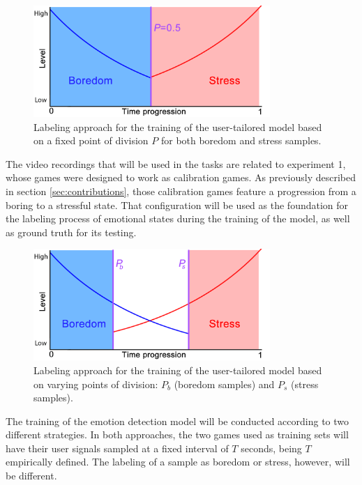 \begin{figure}[h]
    \centering
    \includegraphics[width=0.8\textwidth]{figures/machine-learning-labeling-approach-A.png}
    \caption{Labeling approach for the training of the user-tailored model based on a fixed point of division $P$ for both boredom and stress samples.}
    \label{fig:machine-learning-labeling-approach-A}
\end{figure}

The video recordings that will be used in the tasks are related to experiment 1, whose games were designed to work as calibration games. As previously described in section \ref{sec:contributions}, those calibration games feature a progression from a boring to a stressful state. That configuration will be used as the foundation for the labeling process of emotional states during the training of the model, as well as ground truth for its testing.

\begin{figure}[h]
    \centering
    \includegraphics[width=0.8\textwidth]{figures/machine-learning-labeling-approach-B.png}
    \caption{Labeling approach for the training of the user-tailored model based on varying points of division: $P_b$ (boredom samples) and $P_s$ (stress samples).}
    \label{fig:machine-learning-labeling-approach-B}
\end{figure}

The training of the emotion detection model will be conducted according to two different strategies. In both approaches, the two games used as training sets will have their user signals sampled at a fixed interval of $T$ seconds, being $T$ empirically defined. The labeling of a sample as boredom or stress, however, will be different.

